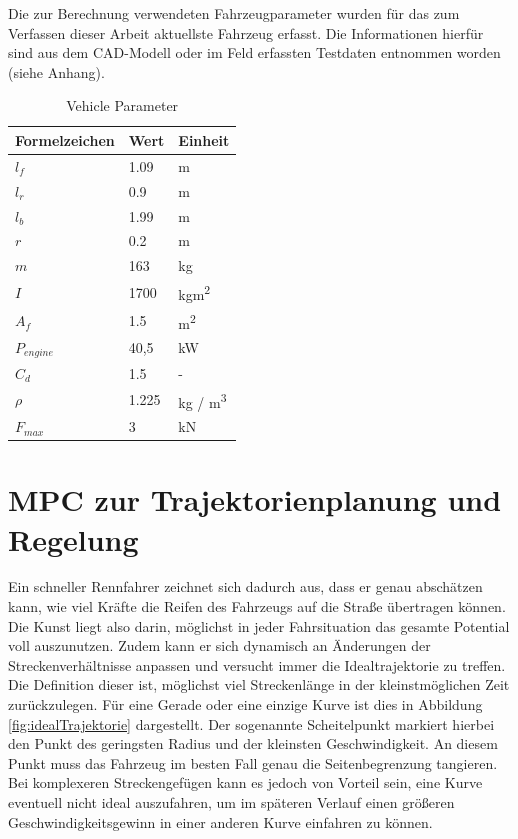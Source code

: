\documentclass{like}
\begin{document}
Die zur Berechnung verwendeten Fahrzeugparameter wurden für das zum Verfassen dieser Arbeit aktuellste Fahrzeug erfasst. Die Informationen hierfür sind aus dem CAD-Modell oder im Feld erfassten Testdaten entnommen worden (siehe Anhang).


\begin{table}[]
	\centering
	\begin{tabular}{l|l|l}
		\hline
		Formelzeichen	& Wert & Einheit \\ \hline
		\(l_f\)	&	1.09 & m\\
		\(l_r\)	&	0.9 & m\\
		\(l_b\)	&	1.99 & m \\
		\(r\)	&	0.2 & m \\
		\(m\)	&  	163 & kg\\
		\(I\)	&  	1700 & kgm\textsuperscript{2}\\
		\(A_f\)	&  	1.5 & m\textsuperscript{2}\\
		\(P_{engine}\) &  40,5 & kW\\
		\(C_d\)	&  	1.5 & - \\
		\(\rho\)	&  	1.225 & kg / m\textsuperscript{3}\\
		\(F_{max}\)	&  	3 & kN \\ 
	\end{tabular}
	\caption{Vehicle Parameter}
	\label{vehicleParam}
\end{table}






\chapter{MPC zur Trajektorienplanung und Regelung}

Ein schneller Rennfahrer zeichnet sich dadurch aus, dass er genau abschätzen kann, wie viel Kräfte die Reifen des Fahrzeugs auf die Straße übertragen können. Die Kunst liegt also darin, möglichst in jeder Fahrsituation das gesamte Potential voll auszunutzen. Zudem kann er sich dynamisch an Änderungen der Streckenverhältnisse anpassen und versucht immer die Idealtrajektorie zu treffen. Die Definition dieser ist, möglichst viel Streckenlänge in der kleinstmöglichen Zeit zurückzulegen. Für eine Gerade oder eine einzige Kurve ist dies in Abbildung \ref{fig:idealTrajektorie} dargestellt. Der sogenannte Scheitelpunkt markiert hierbei den Punkt des geringsten Radius und der kleinsten Geschwindigkeit. An diesem Punkt muss das Fahrzeug im besten Fall genau die Seitenbegrenzung tangieren. 
Bei komplexeren Streckengefügen kann es jedoch von Vorteil sein, eine Kurve eventuell nicht ideal auszufahren, um im späteren Verlauf einen größeren Geschwindigkeitsgewinn in einer anderen Kurve einfahren zu können.
\end{document}
